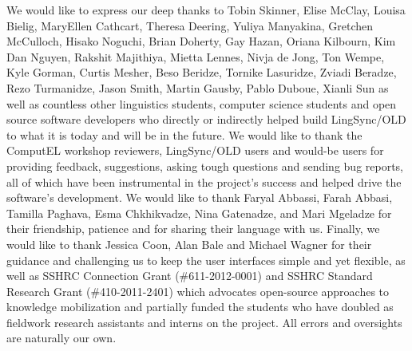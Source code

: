 \documentclass[11pt]{article}
\begin{document}
We would like to express our deep
thanks to Tobin Skinner, Elise McClay, Louisa Bielig, MaryEllen Cathcart,
Theresa Deering, Yuliya Manyakina, Gretchen McCulloch, Hisako Noguchi, Brian
Doherty, Gay Hazan, Oriana Kilbourn, Kim Dan Nguyen, Rakshit Majithiya, Mietta
Lennes, Nivja de Jong, Ton Wempe, Kyle Gorman, Curtis Mesher, Beso Beridze,
Tornike Lasuridze, Zviadi Beradze, Rezo Turmanidze, Jason Smith, Martin
Gausby, Pablo Duboue, Xianli Sun as well as countless other linguistics
students,  computer science students and open source software developers  who
directly or indirectly helped build LingSync/OLD to what it is today and will
be in the future.  We would like to thank the ComputEL workshop reviewers,
LingSync/OLD users and would-be users for providing feedback, suggestions, 
asking tough questions and sending bug reports, all of which have been
instrumental in the project's success and helped drive the software's
development.  We would like to thank Faryal Abbassi, Farah Abbasi, Tamilla
Paghava, Esma Chkhikvadze, Nina Gatenadze, and Mari Mgeladze for their
friendship, patience and for sharing their language with us.  Finally, we would like to thank Jessica Coon, Alan
Bale and Michael Wagner for their guidance and challenging us to keep the user
interfaces simple and yet flexible, as well as SSHRC Connection Grant
(\#611-2012-0001) and SSHRC Standard Research Grant (\#410-2011-2401) which
advocates open-source approaches to knowledge mobilization and partially funded
the students who have doubled as fieldwork research assistants and interns on
the project. All errors and oversights are naturally our own.  

\printglossary




\end{document}

